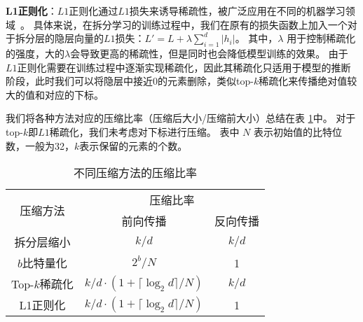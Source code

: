 \textbf{L1正则化}：$L1$正则化通过$L1$损失来诱导稀疏性，被广泛应用在不同的机器学习领域~\cite{tibshirani1996lasso,wright2008sparse_face,yin2012kernel,hoefler2021sparse_deeplearning}。
%
具体来说，在拆分学习的训练过程中，我们在原有的损失函数上加入一个对于拆分层的隐层向量的$L1$损失：$L' = L + \lambda \sum_{i=1}^d |h_i|$。
%
其中，$\lambda$ 用于控制稀疏化的强度，大的$\lambda$会导致更高的稀疏性，但是同时也会降低模型训练的效果。
%
由于$L1$正则化需要在训练过程中逐渐实现稀疏化，因此其稀疏化只适用于模型的推断阶段，此时我们可以将隐层中接近0的元素删除，类似top-$k$稀疏化来传播绝对值较大的值和对应的下标。
%


我们将各种方法对应的压缩比率（压缩后大小/压缩前大小）总结在表 \ref{tab:randomized_top-k:compression_ratio}中。
%
对于top-$k$即$L1$稀疏化，我们未考虑对下标进行压缩。
%
表中 $N$ 表示初始值的比特位数，一般为32，$k$表示保留的元素的个数。

\begin{table}[h]
    \centering
    \begin{tabular}{ccc}
    \toprule
    \multirow{2}{*}{压缩方法} & \multicolumn{2}{c}{压缩比率} \\ 
    \cmidrule(lr){2-3}
            & 前向传播 & 反向传播 \\ \midrule
    拆分层缩小     & $k/d$       & $k/d$ \\
    $b$比特量化    & $2^b/N$    & 1 \\
    Top-$k$稀疏化  & $k/d\cdot (1 + \lceil \log_2 d \rceil/N)$ & $k/d$ \\
    L1正则化       & $k/d\cdot (1 + \lceil \log_2 d \rceil/N)$ & 1 \\
    \bottomrule
    \end{tabular}
    \caption{不同压缩方法的压缩比率}
    \label{tab:randomized_top-k:compression_ratio}
\end{table}